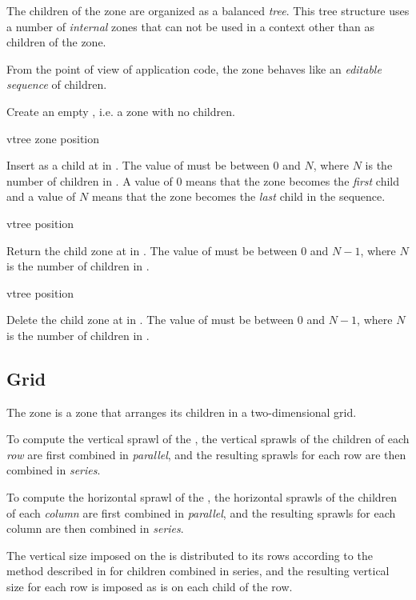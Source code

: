 The children of the  zone are organized as a balanced
\emph{tree}.  This tree structure uses a number of \emph{internal}
zones that can not be used in a context other than as children of the
 zone.  

From the point of view of application code, the  zone
behaves like an \emph{editable sequence} of children.

 {}

Create an empty , i.e. a  zone with no children.

 {vtree zone position}

Insert  as a child at  in .  The
value of  must be between $0$ and $N$, where $N$ is the
number of children in .  A value of $0$ means that the
zone becomes the \emph{first} child and a value of $N$ means that the
zone becomes the \emph{last} child in the sequence.

 {vtree position}

Return the child zone at  in .  The value
of  must be between $0$ and $N-1$, where $N$ is the
number of children in .

 {vtree position}

Delete the child zone at  in .  The value
of  must be between $0$ and $N-1$, where $N$ is the
number of children in . 

\subsection{Grid}
\label{sec-zones-layout-grid}

The  zone is a zone that arranges its children in a
two-dimensional grid.  

To compute the vertical sprawl of the , the vertical
sprawls of the children of each \emph{row} are first combined in
\emph{parallel}, and the resulting sprawls for each row are then
combined in \emph{series}.  

To compute the horizontal sprawl of the , the horizontal
sprawls of the children of each \emph{column} are first combined in
\emph{parallel}, and the resulting sprawls for each column are then
combined in \emph{series}.

The vertical size imposed on the  is distributed to its
rows according to the method described in
 for children combined in
series, and the resulting vertical size for each row is imposed as is
on each child of the row.

